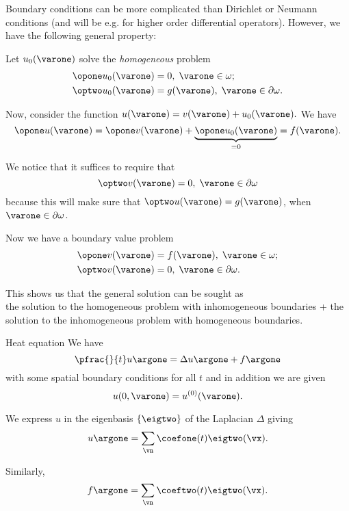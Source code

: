 \begin{frame}
	Boundary conditions can be more complicated than Dirichlet or Neumann conditions (and will be e.g. for higher order differential operators). However, we have the following general property:
	
	\pause
	Let $ u_0(\varone) $ solve the \emph{homogeneous} problem
	\[ \begin{split}
		\opone u_0(\varone) &= 0, \; \varone \in \omega; \\ 
		\optwo u_0(\varone) &= g(\varone), \; \varone \in \partial \omega.
	\end{split} \]
	
	\pause
	Now, consider the function $ u(\varone) = v(\varone) + u_0(\varone). $ We have 
	\[ \opone u(\varone) = \opone v(\varone) + \underbrace{\opone u_0 (\varone)}_{=0} = f(\varone). \]
	
	\pause
	We notice that it suffices to require that 
	\[ \optwo v(\varone) = 0,\; \varone \in \partial \omega \]
	because this will make sure that $ \optwo u(\varone) = g(\varone) $, when $ \varone \in \partial \omega $.
\end{frame}

\begin{frame}
	Now we have a boundary value problem 
	\[ \begin{split}
		\opone v(\varone) &= f(\varone), \; \varone \in \omega; \\ 
		\optwo v(\varone) &= 0, \; \varone \in \partial \omega.
	\end{split} \]
	
	This shows us that the general solution can be sought as \\ \alert{the solution to the homogeneous problem with inhomogeneous boundaries} + \alert{the solution to the inhomogeneous problem with homogeneous boundaries}.
\end{frame}


\begin{frame}{Heat equation}
	We have 
	\[  
	\pfrac{}{t} u\argone = \Delta u\argone + f\argone
	\]
	with some spatial boundary conditions for all $ t $ and in addition we are given
	\[  
	u(0,\varone) = u^{(0)}(\varone).
	\]
	
	\pause
	We express $ u $ in the eigenbasis $ \{ \eigtwo \} $ of the Laplacian $ \Delta $ giving
	\[ u\argone = \sum_{\vn} \coefone(t) \eigtwo(\vx).  \]
	
	Similarly,
	\[ f\argone = \sum_{\vn} \coeftwo(t) \eigtwo(\vx).  \] 
\end{frame}

